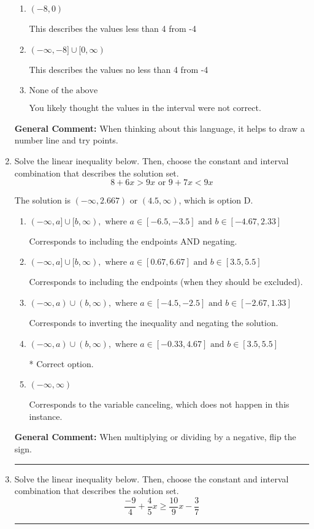 \documentclass{extbook}[14pt]
\newcommand{\litem}[1]{\item #1

\rule{\textwidth}{0.4pt}}
\begin{document}
\begin{enumerate}
{\begin{enumerate}[label=\Alph*.]
This describes the values more than 4 from -4
\item \( (-8, 0) \)

This describes the values less than 4 from -4
\item \( (-\infty, -8] \cup [0, \infty) \)

This describes the values no less than 4 from -4
\item \( \text{None of the above} \)

You likely thought the values in the interval were not correct.
\end{enumerate}

\textbf{General Comment:} When thinking about this language, it helps to draw a number line and try points.
}
\litem{
Solve the linear inequality below. Then, choose the constant and interval combination that describes the solution set.
\[ 8 + 6 x > 9 x \text{ or } 9 + 7 x < 9 x \]

The solution is \( (-\infty, 2.667) \text{ or } (4.5, \infty) \), which is option D.\begin{enumerate}[label=\Alph*.]
\item \( (-\infty, a] \cup [b, \infty), \text{ where } a \in [-6.5, -3.5] \text{ and } b \in [-4.67, 2.33] \)

Corresponds to including the endpoints AND negating.
\item \( (-\infty, a] \cup [b, \infty), \text{ where } a \in [0.67, 6.67] \text{ and } b \in [3.5, 5.5] \)

Corresponds to including the endpoints (when they should be excluded).
\item \( (-\infty, a) \cup (b, \infty), \text{ where } a \in [-4.5, -2.5] \text{ and } b \in [-2.67, 1.33] \)

Corresponds to inverting the inequality and negating the solution.
\item \( (-\infty, a) \cup (b, \infty), \text{ where } a \in [-0.33, 4.67] \text{ and } b \in [3.5, 5.5] \)

 * Correct option.
\item \( (-\infty, \infty) \)

Corresponds to the variable canceling, which does not happen in this instance.
\end{enumerate}

\textbf{General Comment:} When multiplying or dividing by a negative, flip the sign.
}
\litem{
Solve the linear inequality below. Then, choose the constant and interval combination that describes the solution set.
\[ \frac{-9}{4} + \frac{4}{5} x \geq \frac{10}{9} x - \frac{3}{7} \]

}
\end{enumerate}
\end{document}
